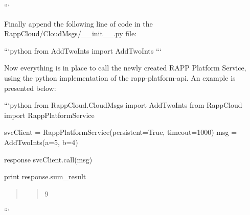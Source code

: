 ```

Finally append the following line of code in the {\ttfamily Rapp\-Cloud/\-Cloud\-Msgs/\-\_\-\-\_\-init\-\_\-\-\_\-.\-py} file\-:

```python from Add\-Two\-Ints import Add\-Two\-Ints ```

Now everything is in place to call the newly created R\-A\-P\-P Platform Service, using the python implementation of the rapp-\/platform-\/api. An example is presented below\-:

```python from Rapp\-Cloud.\-Cloud\-Msgs import Add\-Two\-Ints from Rapp\-Cloud import Rapp\-Platform\-Service

svc\-Client = Rapp\-Platform\-Service(persistent=True, timeout=1000) msg = Add\-Two\-Ints(a=5, b=4)

response svc\-Client.\-call(msg)

print response.\-sum\-\_\-result \begin{quotation}
\begin{quotation}
9

\end{quotation}


\end{quotation}
``` 